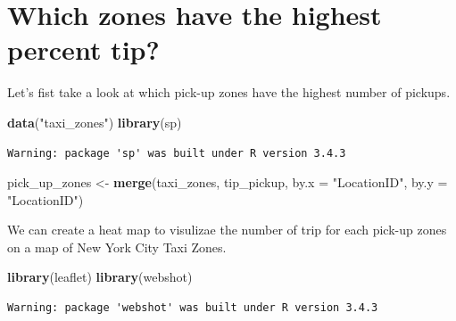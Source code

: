 \documentclass[12pt,twoside]{reedthesis}
\newenvironment{Shaded}{\begin{snugshade}}{\end{snugshade}}
\newcommand{\KeywordTok}[1]{\textcolor[rgb]{0.13,0.29,0.53}{\textbf{#1}}}
\newcommand{\DataTypeTok}[1]{\textcolor[rgb]{0.13,0.29,0.53}{#1}}
\newcommand{\StringTok}[1]{\textcolor[rgb]{0.31,0.60,0.02}{#1}}
\newcommand{\CommentTok}[1]{\textcolor[rgb]{0.56,0.35,0.01}{\textit{#1}}}
\newcommand{\OtherTok}[1]{\textcolor[rgb]{0.56,0.35,0.01}{#1}}
\newcommand{\NormalTok}[1]{#1}
\theoremstyle{definition}
\theoremstyle{definition}
\theoremstyle{definition}
\theoremstyle{remark}
\begin{document}
\section{Which zones have the highest percent
tip?}\label{which-zones-have-the-highest-percent-tip}

Let's fist take a look at which pick-up zones have the highest number of
pickups.
\begin{Shaded}
\begin{Highlighting}[]
\KeywordTok{data}\NormalTok{(}\StringTok{"taxi_zones"}\NormalTok{)}
\KeywordTok{library}\NormalTok{(sp)}
\end{Highlighting}
\end{Shaded}
\begin{verbatim}
Warning: package 'sp' was built under R version 3.4.3
\end{verbatim}
\begin{Shaded}
\begin{Highlighting}[]
\NormalTok{pick_up_zones <-}\StringTok{ }\KeywordTok{merge}\NormalTok{(taxi_zones, tip_pickup, }\DataTypeTok{by.x =} \StringTok{"LocationID"}\NormalTok{, }
    \DataTypeTok{by.y =} \StringTok{"LocationID"}\NormalTok{)}
\end{Highlighting}
\end{Shaded}
We can create a heat map to visulizae the number of trip for each
pick-up zones on a map of New York City Taxi Zones.
\begin{Shaded}
\begin{Highlighting}[]
\KeywordTok{library}\NormalTok{(leaflet)}
\KeywordTok{library}\NormalTok{(webshot)}
\end{Highlighting}
\end{Shaded}
\begin{verbatim}
Warning: package 'webshot' was built under R version 3.4.3
\end{verbatim}
\begin{Shaded}
\end{Shaded}
\end{document}
